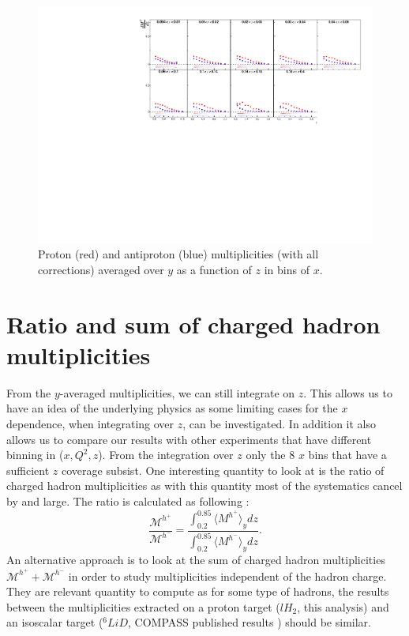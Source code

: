 \begin{figure}[!h]
  \centering
	\includegraphics[scale=0.85]{./gfx/pyavg.pdf}
	\caption{Proton (red) and antiproton (blue) multiplicities (with all corrections) averaged over $y$ as a function of $z$ in bins of $x$.}
	\label{pic:mpyavg}
\end{figure}

\newpage

\section{Ratio and sum of charged hadron multiplicities}

From the $y$-averaged multiplicities, we can still integrate on $z$. This allows us to have an idea of the underlying physics as some limiting cases for the $x$ dependence, when integrating over $z$, can be investigated. In addition it also allows us to compare our results with other experiments that have different binning in ($x,Q^2,z$). From the integration over $z$ only the 8 $x$ bins that have a sufficient $z$ coverage subsist. One interesting quantity to look at is the ratio of charged hadron multiplicities as with this quantity most of the systematics cancel by and large. The ratio is calculated as following :
%
\begin{equation}
  \frac{\mathscr{M}^{h^+}}{\mathscr{M}^{h^-}} = \frac{\int_{0.2}^{0.85} \langle M^{h^+} \rangle_y dz}{\int_{0.2}^{0.85} \langle M^{h^-} \rangle_y dz}.
\end{equation}
%
An alternative approach is to look at the sum of charged hadron multiplicities $\mathscr{M}^{h^+}+\mathscr{M}^{h^-}$ in order to study multiplicities independent of the hadron charge. They are relevant quantity to compute as for some type of hadrons, the results between the multiplicities extracted on a proton target ($lH_2$, this analysis) and an isoscalar target ($^6LiD$, COMPASS published results \cite{COMPASS2006Pi,COMPASS2006K}) should be similar.

